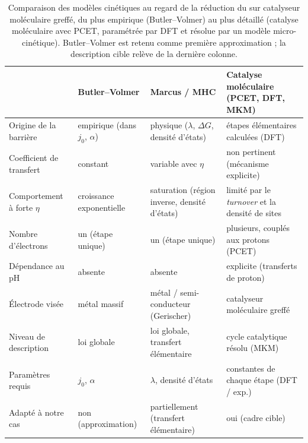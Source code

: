 \begin{table}[htbp]
\centering
\renewcommand{\arraystretch}{1.3}
\begin{tabular}{p{2.7cm}p{3.2cm}p{3.2cm}p{3.6cm}}
\hline
 & \textbf{Butler--Volmer} & \textbf{Marcus / MHC} & \textbf{Catalyse moléculaire (PCET, DFT, MKM)} \\
\hline
Origine de la barrière & empirique (dans $j_0$, $\alpha$)
 & physique ($\lambda$, $\Delta G$, densité d'états)
 & étapes élémentaires calculées (DFT) \\
Coefficient de transfert & constant
 & variable avec $\eta$
 & non pertinent (mécanisme explicite) \\
Comportement à forte $\eta$ & croissance exponentielle
 & saturation (région inverse, densité d'états)
 & limité par le \emph{turnover} et la densité de sites \\
Nombre d'électrons & un (étape unique)
 & un (étape unique)
 & plusieurs, couplés aux protons (PCET) \\
Dépendance au pH & absente
 & absente
 & explicite (transferts de proton) \\
Électrode visée & métal massif
 & métal / semi-conducteur (Gerischer)
 & catalyseur moléculaire greffé \\
Niveau de description & loi globale
 & loi globale, transfert élémentaire
 & cycle catalytique résolu (MKM) \\
Paramètres requis & $j_0$, $\alpha$
 & $\lambda$, densité d'états
 & constantes de chaque étape (DFT / exp.) \\
Adapté à notre cas & non (approximation)
 & partiellement (transfert élémentaire)
 & oui (cadre cible) \\
\hline
\end{tabular}
\caption{Comparaison des modèles cinétiques au regard de la réduction du
 sur catalyseur moléculaire greffé, du plus empirique (Butler--Volmer)
au plus détaillé (catalyse moléculaire avec PCET, paramétrée par DFT et
résolue par un modèle micro-cinétique). Butler--Volmer est retenu comme
première approximation ; la description cible relève de la dernière colonne.}
\label{tab:comparaison_cinetique}
\end{table}


